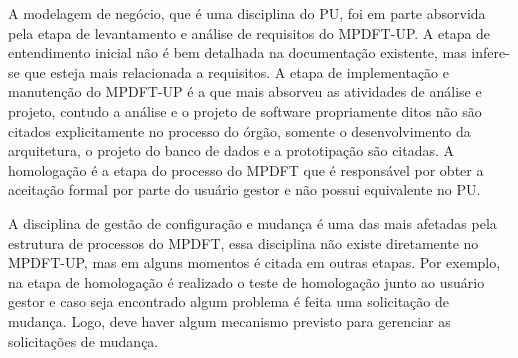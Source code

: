 \documentclass[
	article,			%
	11pt,				%
	oneside,			%
	a4paper,			%
	english,			%
	brazil,				%
	sumario=tradicional
	]{abntex2}
\begin{document}
\begin{table}[htb]
\end{table}

A modelagem de negócio, que é uma disciplina do PU, foi em parte absorvida
pela etapa de levantamento e análise de requisitos do MPDFT-UP. A etapa de
entendimento inicial não é bem detalhada na documentação existente, mas
infere-se que esteja mais relacionada a requisitos. A etapa de implementação e
manutenção do MPDFT-UP é a que mais absorveu as atividades de análise e projeto,
contudo a análise e o projeto de software propriamente ditos não são citados
explicitamente no processo do órgão, somente o desenvolvimento da arquitetura, o
projeto do banco de dados e a prototipação são citadas. A homologação é a etapa
do processo do MPDFT que é responsável por obter a aceitação formal por parte do
usuário gestor e não possui equivalente no PU.

A disciplina de gestão de configuração e mudança é uma das mais afetadas pela
estrutura de processos do MPDFT, essa disciplina não existe diretamente no
MPDFT-UP, mas em alguns momentos é citada em outras etapas. Por exemplo, na
etapa de homologação é realizado o teste de homologação junto ao usuário gestor
e caso seja encontrado algum problema é feita uma solicitação de mudança. Logo,
deve haver algum mecanismo previsto para gerenciar as solicitações de mudança.
\end{document}
